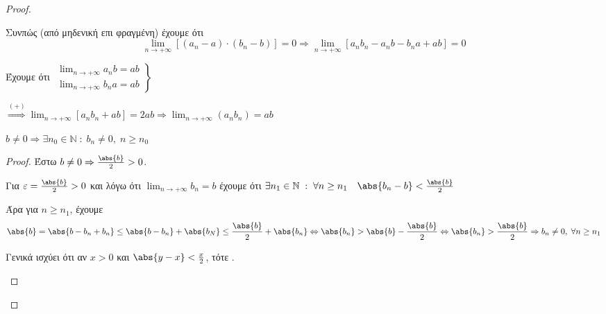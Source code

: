 \documentclass[main.tex]{subfiles}
\begin{document}
\begin{proof}
\begin{enumerate}[i)]
\begin{description}
                    Συνπώς (από μηδενική επι φραγμένη) έχουμε ότι 
                    \[ \lim_{n \to +\infty} [(a_{n}- a) 
                        \cdot (b_{n} -b)] = 0 \Rightarrow 
                        \lim_{n \to +\infty} [a_{n} b_{n} - a_{n}b -
                    b_{n} a + ab] = 0\] 

                    Έχουμε ότι 
                    $
                    \left.
                        \begin{aligned}
                            \lim_{n \to +\infty} a_{n}b = ab \\
                            \lim_{n \to +\infty} b_{n}a = ab
                        \end{aligned} 
                    \right\} $

                    $ \overset{(+)}{\Rightarrow} \lim_{n \to +\infty} 
                    [a_{n} b_{n} + ab] = 2ab \Rightarrow 
                    \lim_{n \to +\infty} (a_{n}b_{n}) = ab $
            \end{description}

        \item \begin{lem}
                $ b \neq 0 \Rightarrow \exists n_{0} \in \mathbb{N} \; 
                : \; b_{n} \neq 0, \; n \geq n_{0} $ 
            \end{lem}

            \begin{proof}
            \item {}
                Έστω $ b \neq 0 \Rightarrow \frac{\abs{b}}{2} >0 $. 

                Για $ \varepsilon = \frac{\abs{b}}{2} >0 $ και λόγω 
                ότι $ \lim_{n \to +\infty} b_{n} = b $
                έχουμε ότι $ \exists n_{1} \in \mathbb{N} \; : \; 
                \forall n \geq n_{1} \quad \abs{b_{n}-b} 
                < \frac{\abs{b}}{2} $

                Άρα για $ n \geq n_{1} $, έχουμε 
                \[
                    \abs{b} = \abs{b - b_{n} + b_{n}} \leq 
                    \abs{b - b_{n}} + \abs{b_{N}} \leq
                    \frac{\abs{b}}{2} + \abs{b_{n}} \Leftrightarrow 
                    \abs{b_{n}} > \abs{b} -
                    \frac{\abs{b}}{2} \Leftrightarrow \abs{b_{n}}  > 
                    \frac{\abs{b}}{2} \Rightarrow b_{n} 
                    \neq 0, \; \forall n \geq n_{1}
                \] 

                \begin{description}
                    \item [Β᾽ Τρόπος:] 
                    \item {}
                        Γενικά ισχύει ότι αν $ x >0 $ και $ 
                        \abs{y-x} < \frac{x}{2} $, 
                        τότε .


\end{description}
\end{proof}
\end{enumerate}
\end{proof}
\end{document}
